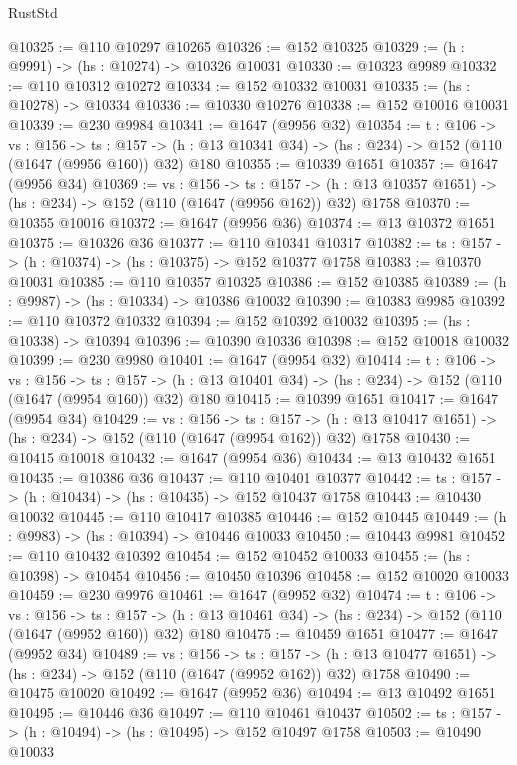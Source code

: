 \begin{lexlean}{RustStd}
\begin{coremodule}
@10325 := @110 @10297 @10265
@10326 := @152 @10325
@10329 := (h : @9991) -> (hs : @10274) -> @10326 @10031
@10330 := @10323 @9989
@10332 := @110 @10312 @10272
@10334 := @152 @10332 @10031
@10335 := (hs : @10278) -> @10334
@10336 := @10330 @10276
@10338 := @152 @10016 @10031
@10339 := @230 @9984
@10341 := @1647 (@9956 @32)
@10354 := {t : @106} ->
  {vs : @156} ->
  {ts : @157} -> (h : @13 @10341 @34) -> (hs : @234) -> @152 (@110 (@1647 (@9956 @160)) @32) @180
@10355 := @10339 @1651
@10357 := @1647 (@9956 @34)
@10369 := {vs : @156} ->
  {ts : @157} -> (h : @13 @10357 @1651) -> (hs : @234) -> @152 (@110 (@1647 (@9956 @162)) @32) @1758
@10370 := @10355 @10016
@10372 := @1647 (@9956 @36)
@10374 := @13 @10372 @1651
@10375 := @10326 @36
@10377 := @110 @10341 @10317
@10382 := {ts : @157} -> (h : @10374) -> (hs : @10375) -> @152 @10377 @1758
@10383 := @10370 @10031
@10385 := @110 @10357 @10325
@10386 := @152 @10385
@10389 := (h : @9987) -> (hs : @10334) -> @10386 @10032
@10390 := @10383 @9985
@10392 := @110 @10372 @10332
@10394 := @152 @10392 @10032
@10395 := (hs : @10338) -> @10394
@10396 := @10390 @10336
@10398 := @152 @10018 @10032
@10399 := @230 @9980
@10401 := @1647 (@9954 @32)
@10414 := {t : @106} ->
  {vs : @156} ->
  {ts : @157} -> (h : @13 @10401 @34) -> (hs : @234) -> @152 (@110 (@1647 (@9954 @160)) @32) @180
@10415 := @10399 @1651
@10417 := @1647 (@9954 @34)
@10429 := {vs : @156} ->
  {ts : @157} -> (h : @13 @10417 @1651) -> (hs : @234) -> @152 (@110 (@1647 (@9954 @162)) @32) @1758
@10430 := @10415 @10018
@10432 := @1647 (@9954 @36)
@10434 := @13 @10432 @1651
@10435 := @10386 @36
@10437 := @110 @10401 @10377
@10442 := {ts : @157} -> (h : @10434) -> (hs : @10435) -> @152 @10437 @1758
@10443 := @10430 @10032
@10445 := @110 @10417 @10385
@10446 := @152 @10445
@10449 := (h : @9983) -> (hs : @10394) -> @10446 @10033
@10450 := @10443 @9981
@10452 := @110 @10432 @10392
@10454 := @152 @10452 @10033
@10455 := (hs : @10398) -> @10454
@10456 := @10450 @10396
@10458 := @152 @10020 @10033
@10459 := @230 @9976
@10461 := @1647 (@9952 @32)
@10474 := {t : @106} ->
  {vs : @156} ->
  {ts : @157} -> (h : @13 @10461 @34) -> (hs : @234) -> @152 (@110 (@1647 (@9952 @160)) @32) @180
@10475 := @10459 @1651
@10477 := @1647 (@9952 @34)
@10489 := {vs : @156} ->
  {ts : @157} -> (h : @13 @10477 @1651) -> (hs : @234) -> @152 (@110 (@1647 (@9952 @162)) @32) @1758
@10490 := @10475 @10020
@10492 := @1647 (@9952 @36)
@10494 := @13 @10492 @1651
@10495 := @10446 @36
@10497 := @110 @10461 @10437
@10502 := {ts : @157} -> (h : @10494) -> (hs : @10495) -> @152 @10497 @1758
@10503 := @10490 @10033

\end{coremodule}
\end{lexlean}

